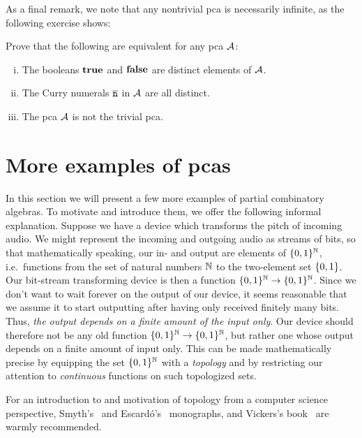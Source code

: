As a final remark, we note that any nontrivial pca is necessarily infinite, as
the following exercise shows:
\begin{exercise}\label{exer:nontrivial-pca}
  Prove that the following are equivalent for any pca \(\AA\):
  \begin{enumerate}[(i)]
  \item The booleans \(\pcatrue\) and \(\pcafalse\) are distinct elements of
    \(\AA\).
  \item The Curry numerals \(\numeral{n}\) in \(\AA\) are all distinct.
  \item The pca \(\AA\) is not the trivial pca.
  \end{enumerate}
\end{exercise}

\section{More examples of pcas}\label{sec:more-examples-of-pcas}

In this section we will present a few more examples of partial combinatory
algebras. To motivate and introduce them, we offer the following informal
explanation. Suppose we have a device which transforms the pitch of incoming
audio. We might represent the incoming and outgoing audio as streams of bits, so
that mathematically speaking, our in- and output are elements of
\(\set{0,1}^\Nat\), i.e.\ functions from the set of natural numbers \(\Nat\) to
the two-element set \(\set{0,1}\).
%
Our bit-stream transforming device is then a function
\(\set{0,1}^\Nat \to \set{0,1}^\Nat\).
%
Since we don't want to wait forever on the output of our device, it seems
reasonable that we assume it to start outputting after having only received
finitely many bits.
%
Thus, \emph{the output depends on a finite amount of the input only}.
%
Our device should therefore not be any old function
\(\set{0,1}^\Nat \to \set{0,1}^\Nat\), but rather one whose output depends on a
finite amount of input only.
%
This can be made mathematically precise by equipping the set \(\set{0,1}^\Nat\)
with a \emph{topology} and by restricting our attention to \emph{continuous}
functions on such topologized sets.

For an introduction to and motivation of topology from a computer science
perspective, Smyth's~\cite{Smyth1992} and Escard\'o's~\cite{Escardo2004}
monographs, and Vickers's book~\cite{Vickers1996} are warmly recommended.

